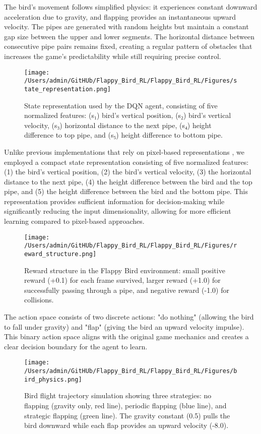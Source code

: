 The bird's movement follows simplified physics: it experiences constant downward acceleration due to gravity, and flapping provides an instantaneous upward velocity. The pipes are generated with random heights but maintain a constant gap size between the upper and lower segments. The horizontal distance between consecutive pipe pairs remains fixed, creating a regular pattern of obstacles that increases the game's predictability while still requiring precise control.
\begin{figure}[!t]
\centering
\texttt{[image: /Users/admin/GitHUb/Flappy\_Bird\_RL/Flappy\_Bird\_RL/Figures/state\_representation.png]}
\caption{State representation used by the DQN agent, consisting of five normalized features: (s₁) bird's vertical position, (s₂) bird's vertical velocity, (s₃) horizontal distance to the next pipe, (s₄) height difference to top pipe, and (s₅) height difference to bottom pipe.}
\label{fig:state_representation}
\end{figure}
Unlike previous implementations that rely on pixel-based representations \cite{yang2023foundation}, we employed a compact state representation consisting of five normalized features: (1) the bird's vertical position, (2) the bird's vertical velocity, (3) the horizontal distance to the next pipe, (4) the height difference between the bird and the top pipe, and (5) the height difference between the bird and the bottom pipe. This representation provides sufficient information for decision-making while significantly reducing the input dimensionality, allowing for more efficient learning compared to pixel-based approaches.
\begin{figure}[!t]
\centering
\texttt{[image: /Users/admin/GitHUb/Flappy\_Bird\_RL/Flappy\_Bird\_RL/Figures/reward\_structure.png]}
\caption{Reward structure in the Flappy Bird environment: small positive reward (+0.1) for each frame survived, larger reward (+1.0) for successfully passing through a pipe, and negative reward (-1.0) for collisions.}
\label{fig:reward_structure}
\end{figure}
The action space consists of two discrete actions: "do nothing" (allowing the bird to fall under gravity) and "flap" (giving the bird an upward velocity impulse). This binary action space aligns with the original game mechanics and creates a clear decision boundary for the agent to learn.
\begin{figure}[!t]
\centering
\texttt{[image: /Users/admin/GitHUb/Flappy\_Bird\_RL/Flappy\_Bird\_RL/Figures/bird\_physics.png]}
\caption{Bird flight trajectory simulation showing three strategies: no flapping (gravity only, red line), periodic flapping (blue line), and strategic flapping (green line). The gravity constant (0.5) pulls the bird downward while each flap provides an upward velocity (-8.0).}
\label{fig:bird_physics}
\end{figure}

